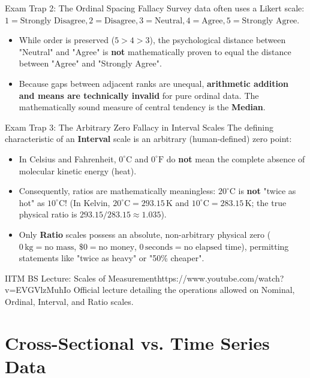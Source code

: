 \begin{trapbox}{Exam Trap 2: The Ordinal Spacing Fallacy}
Survey data often uses a Likert scale: $1 = \text{Strongly Disagree}, 2 = \text{Disagree}, 3 = \text{Neutral}, 4 = \text{Agree}, 5 = \text{Strongly Agree}$.
\begin{itemize}
    \item While order is preserved ($5 > 4 > 3$), the psychological distance between "Neutral" and "Agree" is \textbf{not} mathematically proven to equal the distance between "Agree" and "Strongly Agree".
    \item Because gaps between adjacent ranks are unequal, \textbf{arithmetic addition and means are technically invalid} for pure ordinal data. The mathematically sound measure of central tendency is the \textbf{Median}.
\end{itemize}
\end{trapbox}

\begin{trapbox}{Exam Trap 3: The Arbitrary Zero Fallacy in Interval Scales}
The defining characteristic of an \textbf{Interval} scale is an arbitrary (human-defined) zero point:
\begin{itemize}
    \item In Celsius and Fahrenheit, $0^\circ\text{C}$ and $0^\circ\text{F}$ do \textbf{not} mean the complete absence of molecular kinetic energy (heat).
    \item Consequently, ratios are mathematically meaningless: $20^\circ\text{C}$ is \textbf{not} "twice as hot" as $10^\circ\text{C}$! (In Kelvin, $20^\circ\text{C} = 293.15\,\text{K}$ and $10^\circ\text{C} = 283.15\,\text{K}$; the true physical ratio is $293.15 / 283.15 \approx 1.035$).
    \item Only \textbf{Ratio} scales possess an absolute, non-arbitrary physical zero ($0\,\text{kg} = \text{no mass}$, $\$0 = \text{no money}$, $0\,\text{seconds} = \text{no elapsed time}$), permitting statements like "twice as heavy" or "50\% cheaper".
\end{itemize}
\end{trapbox}

\begin{videocard}{IITM BS Lecture: Scales of Measurement}{https://www.youtube.com/watch?v=EVGVlzMuhIo}
Official lecture detailing the operations allowed on Nominal, Ordinal, Interval, and Ratio scales.
\end{videocard}

\section{Cross-Sectional vs. Time Series Data}


